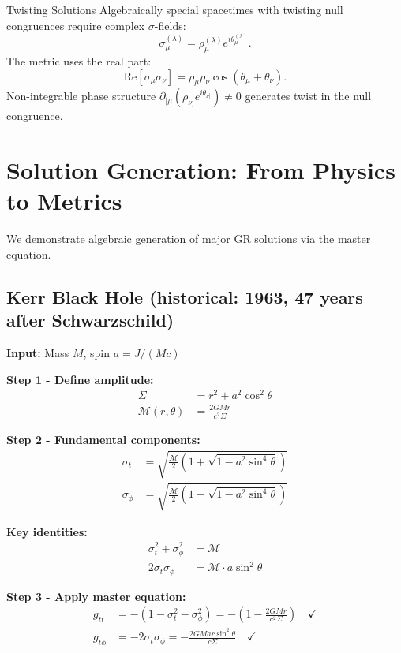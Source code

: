 \documentclass[11pt,a4paper]{article}
\theoremstyle{definition}
\theoremstyle{remark}
\begin{document}
	Twisting Solutions
		Algebraically special spacetimes with twisting null congruences require complex $\sigma$-fields:
		\begin{equation}
			\sigma_\mu^{(\lambda)} = \rho_\mu^{(\lambda)} e^{i\theta_\mu^{(\lambda)}}.
		\end{equation}
		The metric uses the real part:
		\begin{equation}
			\text{Re}[\sigma_\mu \sigma_\nu] = \rho_\mu \rho_\nu \cos(\theta_\mu + \theta_\nu).
		\end{equation}
		Non-integrable phase structure $\partial_{[\mu}(\rho_{\nu]} e^{i\theta_{\nu]}}) \neq 0$ generates twist in the null congruence.
	
	\section{Solution Generation: From Physics to Metrics}
	
	We demonstrate algebraic generation of major GR solutions via the master equation.
	
	\subsection{Kerr Black Hole (historical: 1963, 47 years after Schwarzschild)}
	
	\textbf{Input:} Mass $M$, spin $a = J/(Mc)$
	
	\textbf{Step 1 - Define amplitude:}
	\begin{align}
		\Sigma &= r^2 + a^2\cos^2\theta\\
		\mathcal{M}(r,\theta) &= \frac{2GMr}{c^2\Sigma}
	\end{align}
	
	\textbf{Step 2 - Fundamental components:}
	\begin{align}
		\sigma_t &= \sqrt{\frac{\mathcal{M}}{2}\left(1 + \sqrt{1 - a^2\sin^4\theta}\right)}\\
		\sigma_\phi &= \sqrt{\frac{\mathcal{M}}{2}\left(1 - \sqrt{1 - a^2\sin^4\theta}\right)}
	\end{align}
	
	\textbf{Key identities:}
	\begin{align}
		\sigma_t^2 + \sigma_\phi^2 &= \mathcal{M}\\
		2\sigma_t\sigma_\phi &= \mathcal{M} \cdot a\sin^2\theta
	\end{align}
	
	\textbf{Step 3 - Apply master equation:}
	\begin{align}
		g_{tt} &= -(1 - \sigma_t^2 - \sigma_\phi^2) = -\left(1 - \frac{2GMr}{c^2\Sigma}\right) \quad \checkmark\\
		g_{t\phi} &= -2\sigma_t\sigma_\phi = -\frac{2GMar\sin^2\theta}{c\Sigma} \quad \checkmark
	\end{align}
	
\end{document}

